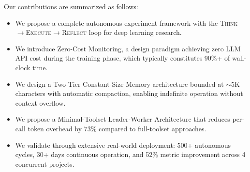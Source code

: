 Our contributions are summarized as follows:
\begin{itemize}[nosep]
    \item We propose a complete autonomous experiment framework with the \textsc{Think}$\rightarrow$\textsc{Execute}$\rightarrow$\textsc{Reflect} loop for deep learning research.
    \item We introduce Zero-Cost Monitoring, a design paradigm achieving zero LLM API cost during the training phase, which typically constitutes 90\%+ of wall-clock time.
    \item We design a Two-Tier Constant-Size Memory architecture bounded at $\sim$5K characters with automatic compaction, enabling indefinite operation without context overflow.
    \item We propose a Minimal-Toolset Leader-Worker Architecture that reduces per-call token overhead by 73\% compared to full-toolset approaches.
    \item We validate through extensive real-world deployment: 500+ autonomous cycles, 30+ days continuous operation, and 52\% metric improvement across 4 concurrent projects.
\end{itemize}
